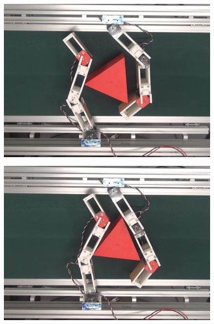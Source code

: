\documentclass[a4paper,twoside,12pt,papersize, dvipdfmx]{iirthesis}
\begin{document}
\begin{figure}[b]
\centering
\begin{minipage}{0.249\hsize}
\centering
\includegraphics[width=0.98\hsize]{fig/4-manipulation-result/Triangle/2-1.jpg}
\subcaption{}\label{}
\end{minipage}\hfill
\begin{minipage}{0.249\hsize}
\centering
\includegraphics[width=0.98\hsize]{fig/4-manipulation-result/Triangle/2-2.jpg}
\subcaption{}\label{}
\end{minipage}\hfill
\begin{minipage}{0.249\hsize}
\centering

\end{minipage}
\end{figure}
\end{document}
